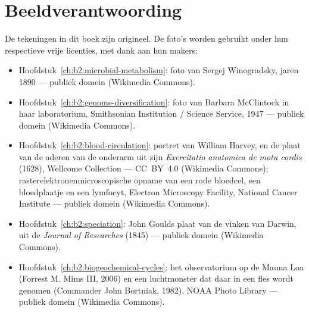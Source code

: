 \chapter*{Beeldverantwoording}

\begingroup\sloppy

De tekeningen in dit boek zijn origineel. De foto's worden gebruikt
onder hun respectieve vrije licenties, met dank aan hun makers:

\begin{itemize}
  \item Hoofdstuk~\ref{ch:b2:microbial-metabolism}: foto van Sergej
        Winogradsky, jaren 1890 --- publiek domein (Wikimedia Commons).
  \item Hoofdstuk~\ref{ch:b2:genome-diversification}: foto van
        Barbara McClintock in haar laboratorium, Smithsonian Institution /
        Science Service, 1947 --- publiek domein (Wikimedia Commons).
  \item Hoofdstuk~\ref{ch:b2:blood-circulation}: portret van William
        Harvey, en de plaat van de aderen van de onderarm uit zijn
        \emph{Exercitatio anatomica de motu cordis} (1628), Wellcome
        Collection --- CC~BY~4.0 (Wikimedia Commons); rasterelektronen\-microscopische
        opname van een rode bloedcel, een bloedplaatje en een lymfocyt, Electron
        Microscopy Facility, National Cancer Institute --- publiek domein
        (Wikimedia Commons).
  \item Hoofdstuk~\ref{ch:b2:speciation}: John Goulds plaat van de vinken
        van Darwin, uit de \emph{Journal of Researches} (1845) --- publiek
        domein (Wikimedia Commons).
  \item Hoofdstuk~\ref{ch:b2:biogeochemical-cycles}: het observatorium op de
        Mauna Loa (Forrest M. Mims III, 2006) en een luchtmonster dat daar
        in een fles wordt genomen (Commander John Bortniak, 1982), NOAA Photo Library
        --- publiek domein (Wikimedia Commons).
\end{itemize}

